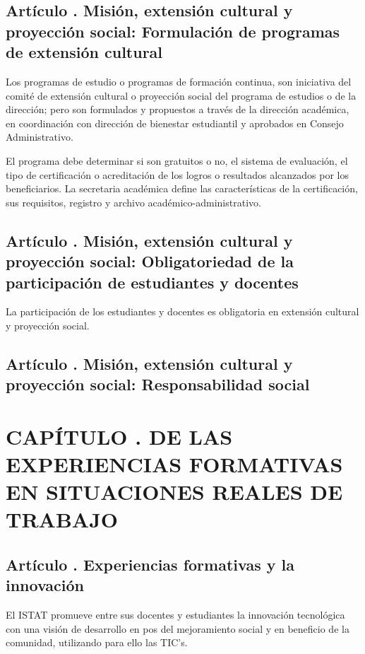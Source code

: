 \subsection{Artículo . Misión, extensión cultural y proyección social: Formulación de programas de extensión cultural}
\addtocounter{ns}{1}
Los programas de estudio o programas de formación continua, son iniciativa del comité de extensión cultural o proyección social del programa de estudios o de la dirección; pero son formulados y propuestos a través de la dirección académica, en coordinación con dirección de bienestar estudiantil y aprobados en Consejo Administrativo. 

El programa debe determinar si son gratuitos o no, el sistema de evaluación, el tipo de certificación o acreditación de los logros o resultados alcanzados por los beneficiarios. La secretaria académica define las características de la certificación, sus requisitos, registro y archivo académico-administrativo. 
\subsection{Artículo . Misión, extensión cultural y proyección social: Obligatoriedad de la participación de estudiantes y docentes}
\addtocounter{ns}{1}
La participación de los estudiantes y docentes es obligatoria en extensión cultural y proyección social.
\subsection{Artículo . Misión, extensión cultural y proyección social: Responsabilidad social}
\addtocounter{ns}{1}
\section{CAPÍTULO . DE LAS EXPERIENCIAS FORMATIVAS EN SITUACIONES REALES DE TRABAJO}
\addtocounter{re}{1}

\subsection{Artículo . Experiencias formativas y la innovación}
\addtocounter{ns}{1}
El ISTAT promueve entre sus docentes y estudiantes la innovación tecnológica con una visión de desarrollo en pos del mejoramiento social y en beneficio de la comunidad, utilizando para ello las TIC’s. 


